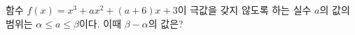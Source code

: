 함수 $f(x)=x^3+ax^2+(a+6)x+3$이 극값을 갖지 않도록 하는 실수 $a$의 값의 범위는 $\alpha\le a\le\beta$이다. 이때 $\beta-\alpha$의 값은?
